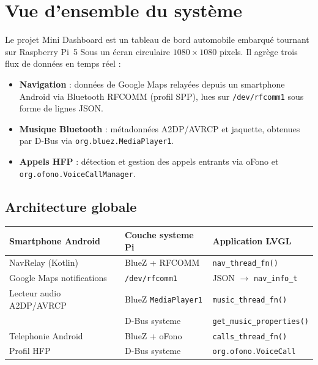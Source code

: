 \documentclass[a4paper,11pt]{article}
\begin{document}
\section{Vue d'ensemble du système}

Le projet Mini Dashboard est un tableau de bord automobile embarqué tournant sur Raspberry Pi~5
Sous un écran circulaire $1080\times1080$ pixels. Il agrège trois flux de données en temps réel :

\begin{itemize}
  \item \textbf{Navigation} : données de Google Maps relayées depuis un smartphone Android via
    Bluetooth RFCOMM (profil SPP), lues sur \texttt{/dev/rfcomm1} sous forme de lignes JSON.
  \item \textbf{Musique Bluetooth} : métadonnées A2DP/AVRCP et jaquette, obtenues par D-Bus via
    \texttt{org.bluez.MediaPlayer1}.
  \item \textbf{Appels HFP} : détection et gestion des appels entrants via oFono et
    \texttt{org.ofono.VoiceCallManager}.
\end{itemize}

\subsection{Architecture globale}

\begin{center}
\begin{tabular}{>{\centering\arraybackslash}m{3.8cm}|>{\centering\arraybackslash}m{4.2cm}|>{\centering\arraybackslash}m{4.2cm}}
\toprule
\textbf{Smartphone Android} & \textbf{Couche systeme Pi} & \textbf{Application LVGL} \\
\midrule
NavRelay (Kotlin) & BlueZ + RFCOMM & \texttt{nav\_thread\_fn()} \\
Google Maps notifications & \texttt{/dev/rfcomm1} & JSON $\to$ \texttt{nav\_info\_t} \\
\hline
Lecteur audio A2DP/AVRCP & BlueZ \texttt{MediaPlayer1} & \texttt{music\_thread\_fn()} \\
& D-Bus systeme & \texttt{get\_music\_properties()} \\
\hline
Telephonie Android & BlueZ + oFono & \texttt{calls\_thread\_fn()} \\
Profil HFP & D-Bus systeme & \texttt{org.ofono.VoiceCall} \\
\bottomrule
\end{tabular}
\end{center}
\end{document}
